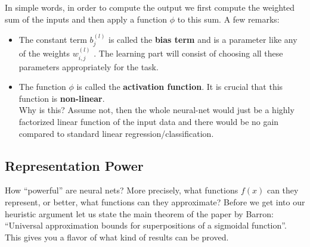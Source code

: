 \documentclass[twoside]{article}
\begin{document}
In simple words, in order to compute the output we first compute
the weighted sum of the inputs and then apply a function $\phi$
to this sum.
\newpage
A few remarks:

\begin{itemize}
    \item The constant term $b^{(l)}_{j}$ is called the \textbf{bias term} and is a parameter like any of the weights $w^{(l)}_{i,j}$ . The learning part will consist of choosing all these parameters appropriately for the task.
    \item The function $\phi$
is called the \textbf{activation function}. It is crucial that this function is \textbf{non-linear}.\\ Why is this?
Assume not, then the whole neural-net would just be a highly
factorized linear function of the input data and there would
be no gain compared to standard linear regression/classification. 
\end{itemize}
\subsection{Representation Power}

How “powerful” are neural nets? More precisely, what functions $f(x)$ can they represent, or better, what functions can they approximate? Before we get into our heuristic argument let us state the
main theorem of the paper by Barron: “Universal approximation bounds for superpositions of a sigmoidal function”. This gives you a
flavor of what kind of results can be proved.
\end{document}
